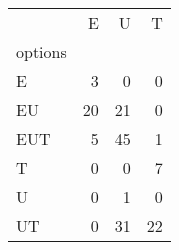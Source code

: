 \begin{tabular}{lrrr}
\toprule
{} &   E &   U &   T \\
options &     &     &     \\
\midrule
E       &   3 &   0 &   0 \\
EU      &  20 &  21 &   0 \\
EUT     &   5 &  45 &   1 \\
T       &   0 &   0 &   7 \\
U       &   0 &   1 &   0 \\
UT      &   0 &  31 &  22 \\
\bottomrule
\end{tabular}
